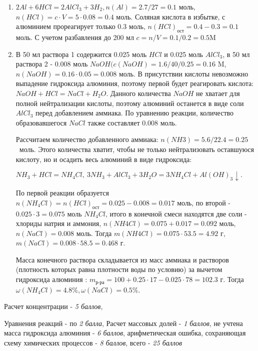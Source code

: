 \solutionSection

\begin{enumerate}
    \item $2Al + 6HCl = 2AlCl_3 + 3H_2, n(Al) = 2.7/27 = 0.1$ моль, $n(HCl) = c \cdot V = 5 \cdot 0.08 = 0.4$ моль. 
    Соляная кислота в избытке, с алюминием прореагирует только 0.3 моль, $n(HCl)_\text{ост} = 0.4 - 0.3 = 0.1$ моль. 
    С учетом разбавления до 200 мл $c = n/V = 0.1/0.2 = 0.5$M
    \item В 50 мл раствора 1 содержится 0.025 моль $HCl$ и 0.025 моль $AlCl_3$, в 50 мл раствора 2 - 0.008 моль 
    $NaOH (c(NaOH) = 1.6/40/0.25= 0.16$ M, \linebreak $n(NaOH) = 0.16 \cdot 0.05 = 0.008$ моль. В присутствии кислоты невозможно 
    выпадение гидроксида алюминия, поэтому первой будет реагировать кислота: $NaOH + HCl = NaCl + H_2O$. Данного 
    количества $NaOH$ не хватает для полной нейтрализации кислоты, поэтому алюминий останется в виде соли $AlCl_3$ 
    перед добавлением аммиака. По уравнению реакции, количество образовавшегося $NaCl$ также составляет 0.008 моль.
    
    Рассчитаем количество добавленного аммиака: $n(NH3) = 5.6/22.4 = 0.25$~моль. Этого количества хватит, чтобы не 
    только нейтрализовать оставшуюся кислоту, но и осадить весь алюминий в виде гидроксида:

    $NH_3 + HCl = NH_4Cl, \: 3NH_3 + AlCl_3 + 3H_2O = 3NH_4Cl + Al(OH)_3 \downarrow.$ 
    
    По первой реакции образуется $n(NH_4Cl) = n(HCl)_\text{ост} = 0.025 - 0.008 = 0.017$ моль, по второй - 
    $0.025 \cdot 3 = 0.075$ моль $NH_4Cl$, итого в конечной смеси находятся две соли - хлориды натрия и аммония, 
    $n(NH4Cl) = 0.075 + 0.017 = 0.092$ моль, $n(NaCl) = 0.008$ моль. Тогда $m(NH4Cl) = 0.075 \cdot 53.5 = 4.92$ г,  
    $m(NaCl) = 0.008 \cdot 58.5 = 0.468$ г. 

    Масса конечного раствора складывается из масс аммиака и растворов (плотность которых равна плотности воды по 
    условию) за вычетом гидроксида алюминия : $m_{\text{р-ра}} = 100 + 0.25 \cdot 17 - 0.025 \cdot 78= 102.3$ г. \linebreak 
    Тогда $\omega(NH_4Cl) = 4.8\%, \omega(NaCl) = 0.5\%$. 
    
\end{enumerate}

Расчет концентрации - \textit{5 баллов}, 

Уравнения реакций - по \textit{2 балла}, Расчет массовых долей - \textit{1 баллов}, не учтена масса гидроксида алюминия - \textit{6 баллов}, арифметическая ошибка, сохраняющая схему химических процессов - \textit{8 баллов}, всего - \textit{25 баллов}
